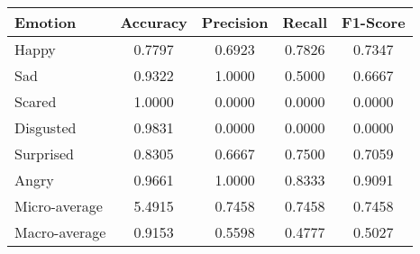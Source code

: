 \begin{tabular}{lcccc}
\toprule
Emotion & Accuracy & Precision & Recall & F1-Score \\
\midrule
Happy & 0.7797 & 0.6923 & 0.7826 & 0.7347 \\
Sad & 0.9322 & 1.0000 & 0.5000 & 0.6667 \\
Scared & 1.0000 & 0.0000 & 0.0000 & 0.0000 \\
Disgusted & 0.9831 & 0.0000 & 0.0000 & 0.0000 \\
Surprised & 0.8305 & 0.6667 & 0.7500 & 0.7059 \\
Angry & 0.9661 & 1.0000 & 0.8333 & 0.9091 \\
Micro-average & 5.4915 & 0.7458 & 0.7458 & 0.7458 \\
Macro-average & 0.9153 & 0.5598 & 0.4777 & 0.5027 \\
\bottomrule
\end{tabular}
